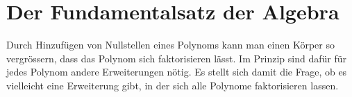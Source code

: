 %
%
%
\section{Der Fundamentalsatz der Algebra
\label{buch:komplex:section:fundamental}}
Durch Hinzufügen von Nullstellen eines Polynoms kann man einen
Körper so vergrössern, dass das Polynom sich faktorisieren lässt.
Im Prinzip sind dafür für jedes Polynom andere Erweiterungen nötig.
Es stellt sich damit die Frage, ob es vielleicht eine Erweiterung
gibt, in der sich alle Polynome faktorisieren lassen.



